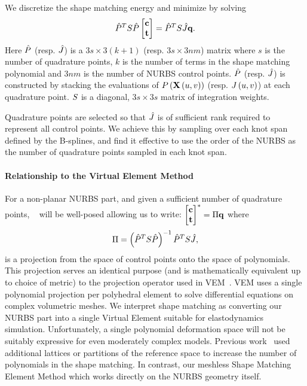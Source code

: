 We discretize the shape matching energy and minimize by solving
\begin{equation}
\hat{P}^TS\hat{P}\begin{bmatrix} \mathbf{c}\\ \mathbf{t} \end{bmatrix} = \hat{P}^TS\hat{J}\mathbf{q}.
\label{eq:shapematch}
\end{equation} Here $\hat{P}$ (resp. $\hat{J}$) is a $3s \times 3(k+1)$ (resp. $3s \times 3nm$) matrix where $s$ is the number of quadrature points, 
$k$ is the number of  terms in the shape matching polynomial and $3nm$ is the number of NURBS control points. 
$\hat{P}$ (resp. $\hat{J}$) is constructed by stacking the evaluations of $P\left(\mathbf{X}\left(u,v\right)\right)$ (resp. $J\left(u, v\right)$) at each
quadrature point.
$S$ is a diagonal, $3s \times 3s$ matrix of integration weights.

Quadrature points are selected so that $\hat{J}$ is of sufficient rank required to represent all control points. We achieve this by sampling over each knot span defined by the  B-splines, and find it effective to use the order of the NURBS as the number of quadrature points sampled in each knot span.

\paragraph*{Relationship to the Virtual Element Method}
For a non-planar NURBS part, and given a sufficient number of quadrature points, ~ will be well-posed allowing us to write: $\begin{bmatrix} \mathbf{c}\\ \mathbf{t} \end{bmatrix}^* = \Pi\mathbf{q}$ where
\begin{equation*}
    \Pi = \left(\hat{P}^TS\hat{P}\right)^{-1}\hat{P}^TS\hat{J},
\end{equation*} is a projection from the space of control points onto the space of polynomials. 
This projection serves an identical purpose (and is mathematically equivalent up to choice of metric) to the projection operator used in VEM~\cite{10.1142/S021820251440003X}.
VEM uses a single polynomial projection per polyhedral element to solve differential equations on complex volumetric meshes.
We interpret shape matching as converting our NURBS part into a single Virtual Element suitable for elastodynamics simulation.
Unfortunately, a single polynomial deformation space will not be suitably expressive for even moderately complex models.
Previous work~\cite{10.1145/1073204.1073216,10.1145/1275808.1276480} used additional lattices or partitions of the reference space to 
increase the number of polynomials in the shape matching. In contrast, our meshless Shape Matching Element Method which works directly on the NURBS
geometry itself.

